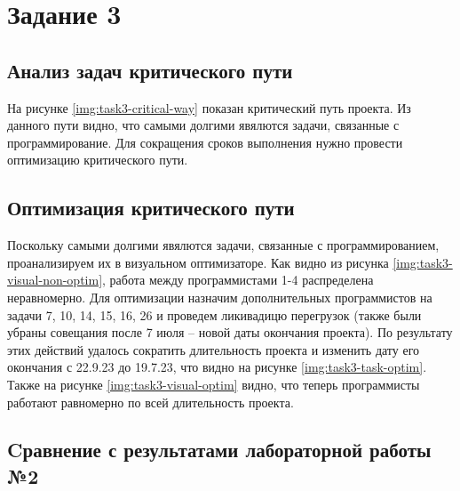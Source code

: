 

\section{Задание 3}

\subsection{Анализ задач критического пути}

На рисунке \ref{img:task3-critical-way} показан критический путь проекта. Из данного пути видно, что самыми долгими явялются задачи, связанные с программирование. Для сокращения сроков выполнения нужно провести оптимизацию критического пути.



\subsection{Оптимизация критического пути}

Поскольку самыми долгими явялются задачи, связанные с программированием, проанализируем их в визуальном оптимизаторе. Как видно из рисунка \ref{img:task3-visual-non-optim}, работа между программистами 1-4 распределена неравномерно. Для оптимизации назначим дополнительных программистов на задачи 7, 10, 14, 15, 16, 26 и проведем ликивадицю перегрузок (также были убраны совещания после 7 июля -- новой даты окончания проекта). По результату этих действий удалось сократить длительность проекта и изменить дату его окончания с 22.9.23 до 19.7.23, что видно на рисунке \ref{img:task3-task-optim}. Также на рисунке \ref{img:task3-visual-optim} видно, что теперь программисты работают равномерно по всей длительность проекта.



\clearpage

\subsection{Cравнение с результатами лабораторной работы №2}

